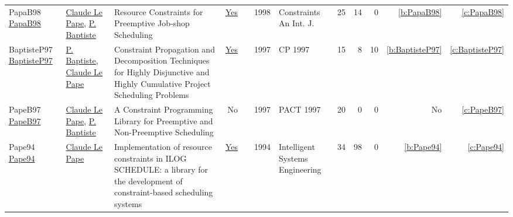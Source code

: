 {\begin{longtable}{>{\raggedright\arraybackslash}p{3cm}>{\raggedright\arraybackslash}p{6cm}>{\raggedright\arraybackslash}p{6.5cm}rrrp{2.5cm}rrrrr}
PapaB98 \href{https://doi.org/10.1023/A:1009723704757}{PapaB98} & \hyperref[auth:a165]{Claude Le Pape}, \hyperref[auth:a164]{P. Baptiste} & Resource Constraints for Preemptive Job-shop Scheduling & \href{works/PapaB98.pdf}{Yes} & \cite{PapaB98} & 1998 & Constraints An Int. J. & 25 & 14 & 0 & \ref{b:PapaB98} & \ref{c:PapaB98}\\
BaptisteP97 \href{https://doi.org/10.1007/BFb0017454}{BaptisteP97} & \hyperref[auth:a164]{P. Baptiste}, \hyperref[auth:a165]{Claude Le Pape} & Constraint Propagation and Decomposition Techniques for Highly Disjunctive and Highly Cumulative Project Scheduling Problems & \href{works/BaptisteP97.pdf}{Yes} & \cite{BaptisteP97} & 1997 & CP 1997 & 15 & 8 & 10 & \ref{b:BaptisteP97} & \ref{c:BaptisteP97}\\
PapeB97 \href{}{PapeB97} & \hyperref[auth:a165]{Claude Le Pape}, \hyperref[auth:a164]{P. Baptiste} & A Constraint Programming Library for Preemptive and Non-Preemptive Scheduling & No & \cite{PapeB97} & 1997 & PACT 1997 & 20 & 0 & 0 & No & \ref{c:PapeB97}\\
Pape94 \href{http://dx.doi.org/10.1049/ise.1994.0009}{Pape94} & \hyperref[auth:a165]{Claude Le Pape} & Implementation of resource constraints in ILOG SCHEDULE: a library for the development of constraint-based scheduling systems & \href{works/Pape94.pdf}{Yes} & \cite{Pape94} & 1994 & Intelligent Systems Engineering & 34 & 98 & 0 & \ref{b:Pape94} & \ref{c:Pape94}\\
\end{longtable}
}

